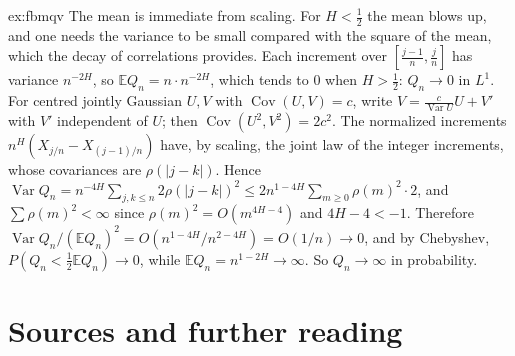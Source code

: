 \begin{solution}{ex:fbmqv}
\idea The mean is immediate from scaling. For $H<\frac12$ the mean blows up, and one needs the variance to be small compared with the square of the mean, which the decay of correlations provides.
\writeup Each increment over $[\frac{j-1}n,\frac jn]$ has variance $n^{-2H}$, so $\mathbb E Q_n=n\cdot n^{-2H}$, which tends to $0$ when $H>\frac12$: $Q_n\to0$ in $L^1$. For centred jointly Gaussian $U,V$ with
$\operatorname{Cov}(U,V)=c$, write $V=\frac c{\operatorname{Var}U}U+V'$ with $V'$ independent of $U$; then $\operatorname{Cov}(U^2,V^2)=2c^2$. The normalized increments $n^H(X_{j/n}-X_{(j-1)/n})$ have, by scaling, the joint
law of the integer increments, whose covariances are $\rho(|j-k|)$. Hence $\operatorname{Var}Q_n=n^{-4H}\sum_{j,k\le n}2\rho(|j-k|)^2\le2n^{1-4H}\sum_{m\ge0}\rho(m)^2\cdot2$, and $\sum\rho(m)^2<\infty$ since
$\rho(m)^2=O(m^{4H-4})$ and $4H-4<-1$. Therefore $\operatorname{Var}Q_n/(\mathbb E Q_n)^2=O(n^{1-4H}/n^{2-4H})=O(1/n)\to0$, and by Chebyshev, $P(Q_n<\frac12\mathbb E Q_n)\to0$, while $\mathbb E Q_n=n^{1-2H}\to\infty$. So
$Q_n\to\infty$ in probability.
\end{solution}

\section*{Sources and further reading}

